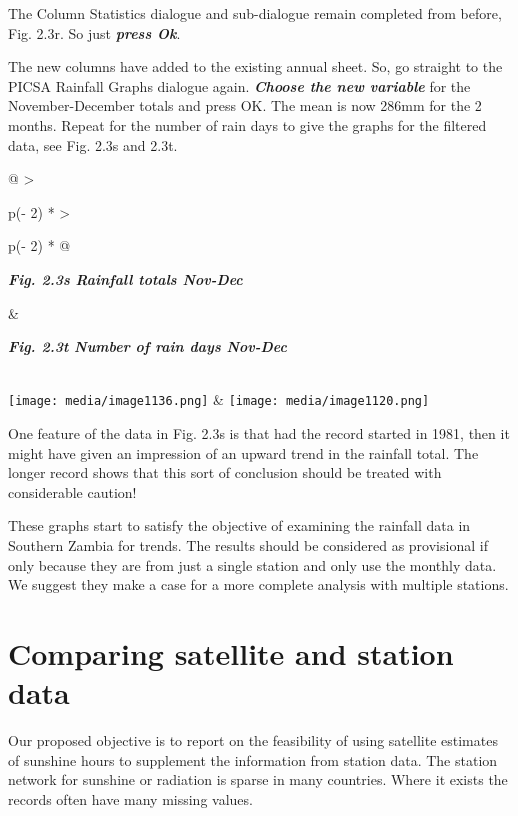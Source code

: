 \documentclass[
  letterpaper,
  DIV=11,
  numbers=noendperiod]{scrreprt}
\begin{document}
The Column Statistics dialogue and sub-dialogue remain completed from
before, Fig. 2.3r. So just \textbf{\emph{press Ok}}.

The new columns have added to the existing annual sheet. So, go straight
to the PICSA Rainfall Graphs dialogue again. \textbf{\emph{Choose the
new variable}} for the November-December totals and press OK. The mean
is now 286mm for the 2 months. Repeat for the number of rain days to
give the graphs for the filtered data, see Fig. 2.3s and 2.3t.

\begin{longtable}[]{@{}
  >{\raggedright\arraybackslash}p{(\columnwidth - 2\tabcolsep) * }
  >{\raggedright\arraybackslash}p{(\columnwidth - 2\tabcolsep) * }@{}}
\toprule\noalign{}
\begin{minipage}[b]{\linewidth}\raggedright
\textbf{\emph{Fig. 2.3s Rainfall totals Nov-Dec}}
\end{minipage} & \begin{minipage}[b]{\linewidth}\raggedright
\textbf{\emph{Fig. 2.3t Number of rain days Nov-Dec}}
\end{minipage} \\
\midrule\noalign{}
\endhead
\bottomrule\noalign{}
\endlastfoot
\texttt{[image: media/image1136.png]}
&
\texttt{[image: media/image1120.png]} \\
\end{longtable}

One feature of the data in Fig. 2.3s is that had the record started in
1981, then it might have given an impression of an upward trend in the
rainfall total. The longer record shows that this sort of conclusion
should be treated with considerable caution!

These graphs start to satisfy the objective of examining the rainfall
data in Southern Zambia for trends. The results should be considered as
provisional if only because they are from just a single station and only
use the monthly data. We suggest they make a case for a more complete
analysis with multiple stations.

\section{Comparing satellite and station
data}\label{comparing-satellite-and-station-data}

Our proposed objective is to report on the feasibility of using
satellite estimates of sunshine hours to supplement the information from
station data. The station network for sunshine or radiation is sparse in
many countries. Where it exists the records often have many missing
values.
\end{document}
